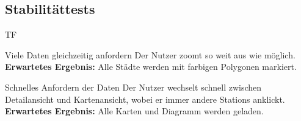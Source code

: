 \subsection{Stabilitättests}
\begin{Kriterien}{TF}

	\item[Viele Daten gleichzeitig anfordern] Der Nutzer zoomt so weit aus wie möglich.\\ \textbf{Erwartetes Ergebnis:} Alle Städte werden mit farbigen Polygonen markiert.

	\item[Schnelles Anfordern der Daten] Der Nutzer wechselt schnell zwischen Detailansicht und Kartenansicht, wobei er immer andere \glspl{Station} anklickt. \\ \textbf{Erwartetes Ergebnis:} Alle Karten und Diagramm werden geladen.

\end{Kriterien}
